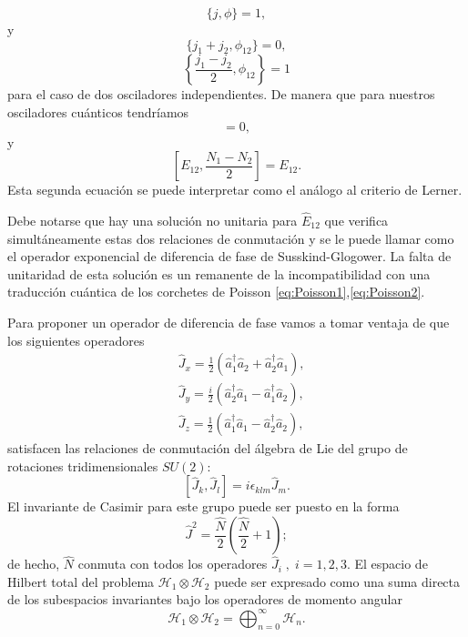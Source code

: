     \begin{equation}\label{eq:Poisson1}
        \{j,\phi\} = 1,
    \end{equation}
    y
    \begin{equation}\label{eq:Poisson2}
        \{j_1 + j_2,\phi_{12}\} = 0,
    \end{equation}
    \begin{equation}
        \left\{\frac{j_1 - j_2}{2},\phi_{12}\right\} = 1
    \end{equation}
    para el caso de dos osciladores independientes. De manera que para nuestros osciladores cuánticos tendríamos 
    \begin{equation}
        [E_{12},N_1+N_2] = 0,
    \end{equation}
    y 
    \begin{equation}
        \left[E_{12},\frac{N_1 - N_2}{2}\right] = E_{12}.
    \end{equation}
    Esta segunda ecuación se puede interpretar como el análogo al criterio de Lerner.

    Debe notarse que hay una solución no unitaria para $\hat{E}_{12}$ que verifica simultáneamente estas dos relaciones de conmutación y se le puede llamar como el operador exponencial de diferencia de fase de Susskind-Glogower. La falta de unitaridad de esta solución es un remanente de la incompatibilidad con una traducción cuántica de los corchetes de Poisson \ref{eq:Poisson1},\ref{eq:Poisson2}.

    Para proponer un operador de diferencia de fase vamos a tomar ventaja de que los siguientes operadores
    \begin{align}\label{eq:Jotas}
        & \hat{J}_x = \frac{1}{2}\left(  \hat{a}_1^\dagger \hat{a}_2 + \hat{a}_2^\dagger\hat{a}_1\right),\\
        & \hat{J}_y = \frac{i}{2}\left( \hat{a}_2^\dagger\hat{a}_1 - \hat{a}_1^\dagger\hat{a}_2 \right),\\
        & \hat{J}_z = \frac{1}{2}\left( \hat{a}_1^\dagger \hat{a}_1 - \hat{a}_2^\dagger\hat{a}_2 \right),
    \end{align}
    satisfacen las relaciones de conmutación del álgebra de Lie del grupo de rotaciones tridimensionales $SU(2)$:
    \begin{equation}
        \left[ \hat{J}_k, \hat{J}_l \right] = i \epsilon_{klm}\hat{J}_m.
    \end{equation}
    El invariante de Casimir para este grupo puede ser puesto en la forma
    \begin{equation}
        \hat{J}^2 = \frac{\hat{N}}{2}\left( \frac{\hat{N}}{2}+1 \right);
    \end{equation}
    de hecho, $\hat{N}$ conmuta con todos los operadores $\hat{J}_i\;,\; i=1,2,3$. El espacio de Hilbert total del problema $\mathcal{H}_1\otimes \mathcal{H}_2$ puede ser expresado como una suma directa de los subespacios invariantes bajo los operadores de momento angular
    \begin{equation}
        \mathcal{H}_1\otimes\mathcal{H}_2 = \bigoplus_{n=0}^\infty \mathcal{H}_n.
    \end{equation}

